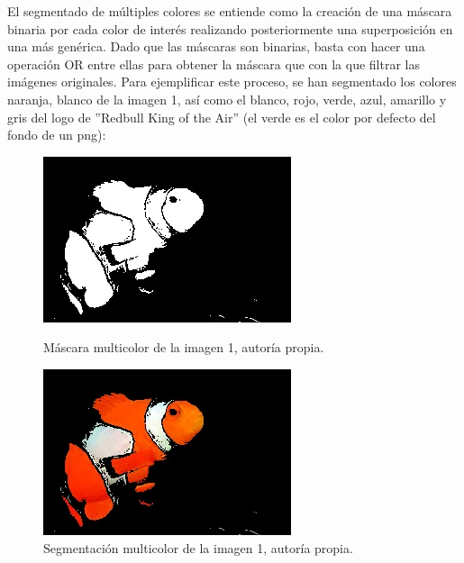 \documentclass[a4paper,12pt]{article}
\begin{document}
{\vspace{0.5cm}

El segmentado de múltiples colores se entiende como la creación de una máscara binaria por cada color de interés realizando posteriormente una superposición en 
una más genérica. Dado que las máscaras son binarias, basta con hacer una operación OR entre ellas para obtener la máscara que con la que filtrar las imágenes originales. 
Para ejemplificar este proceso, se han segmentado los colores naranja, blanco de la imagen 1, así como el blanco, rojo, verde, azul, amarillo y gris del logo de 
''Redbull King of the Air'' (el verde es el color por defecto del fondo de un png):

\vspace{0.5cm}

\begin{figure}[H]
  \centering
  \begin{minipage}[t]{0.3\textwidth}
      \includegraphics[width=\textwidth]{processed_data/fish_mask_0.jpg} 
      \caption{Máscara multicolor de la imagen 1, autoría propia.}
      \label{fig:multicolor_mask}
  \end{minipage}
  \hfill
  \begin{minipage}[t]{0.3\textwidth}
      \includegraphics[width=\textwidth]{processed_data/fish_segmented_0.jpg}
      \caption{Segmentación multicolor de la imagen 1, autoría propia.}
      \label{fig:multicolor_segmented}
  \end{minipage}


\end{figure}}
\end{document}
